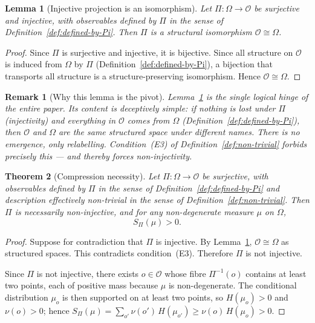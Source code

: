 \documentclass[12pt,a4paper]{article}
\newtheorem{theorem}{Theorem}
\newtheorem{lemma}[theorem]{Lemma}
\newtheorem{remark}{Remark}
\begin{document}
  \begin{lemma}[Injective projection is an isomorphism]
    \label{lem:pivot}
    Let $\Pi : \Omega \to \mathcal{O}$ be surjective and injective, with
    observables defined by $\Pi$ in the sense of Definition~\ref{def:defined-by-Pi}.
    Then $\Pi$ is a structural isomorphism $\mathcal{O} \cong \Omega$.
  \end{lemma}

  \begin{proof}
    Since $\Pi$ is surjective and injective, it is bijective.
    Since all structure on $\mathcal{O}$ is induced from $\Omega$ by $\Pi$
    (Definition~\ref{def:defined-by-Pi}), a bijection that transports all
    structure is a structure-preserving isomorphism.
    Hence $\mathcal{O} \cong \Omega$.
  \end{proof}

  \begin{remark}[Why this lemma is the pivot]
      Lemma~\ref{lem:pivot} is the single logical hinge of the entire paper.
      Its content is deceptively simple: if nothing is lost under $\Pi$ (injectivity)
      and everything in $\mathcal{O}$ comes from $\Omega$ (Definition~\ref{def:defined-by-Pi}),
      then $\mathcal{O}$ and $\Omega$ are the same structured space under different names.
      There is no emergence, only relabelling.
      Condition~(E3) of Definition~\ref{def:non-trivial} forbids precisely this ---
      and thereby forces non-injectivity.
  \end{remark}

  \begin{theorem}[Compression necessity]
    \label{thm:main}
    Let $\Pi : \Omega \to \mathcal{O}$ be surjective, with observables defined by
    $\Pi$ in the sense of Definition~\ref{def:defined-by-Pi} and description
    effectively non-trivial in the sense of Definition~\ref{def:non-trivial}.
    Then $\Pi$ is necessarily non-injective, and for any non-degenerate measure
    $\mu$ on $\Omega$,
    \[
      S_\Pi(\mu) > 0.
    \]
  \end{theorem}

  \begin{proof}
    Suppose for contradiction that $\Pi$ is injective.
    By Lemma~\ref{lem:pivot}, $\mathcal{O} \cong \Omega$ as structured spaces.
    This contradicts condition~(E3).
    Therefore $\Pi$ is not injective.

    Since $\Pi$ is not injective, there exists $o \in \mathcal{O}$ whose fibre $\Pi^{-1}(o)$ contains at least
    two points, each of positive mass because $\mu$ is non-degenerate.
    The conditional distribution $\mu_o$ is then supported on at least two points, so $H(\mu_o) > 0$ and
    $\nu(o) > 0$; hence
    $S_\Pi(\mu) = \sum_{o'} \nu(o')\, H(\mu_{o'}) \geq \nu(o)\, H(\mu_o) > 0$.
  \end{proof}
\end{document}
